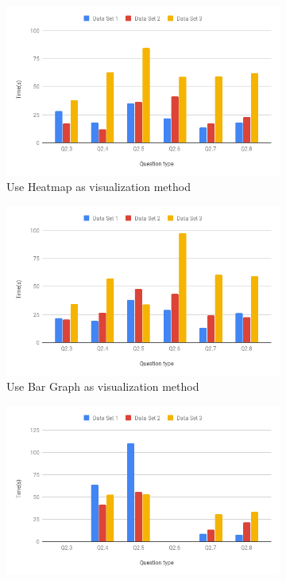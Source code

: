 \begin{figure}[h]
	\centering
	\begin{subfigure}[b]{0.48\textwidth}
		\centering
		\includegraphics[width=\textwidth]{pictures/TimeH}
		\caption{Use Heatmap as visualization method}
	\end{subfigure}
	\hfill
	\begin{subfigure}[b]{0.48\textwidth}
		\centering
		\includegraphics[width=\textwidth]{pictures/TimeB}
		\caption{Use Bar Graph as visualization method}
	\end{subfigure}
	\hfill
	\begin{subfigure}[b]{0.48\textwidth}
		\centering
		\includegraphics[width=\textwidth]{pictures/TimeF}

\end{subfigure}
\end{figure}

